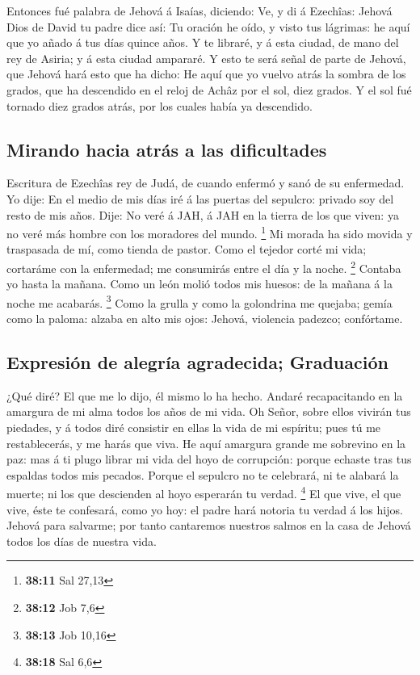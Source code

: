 Entonces fué palabra de Jehová á Isaías, diciendo:
 Ve, y di á Ezechîas: Jehová Dios de David tu padre dice
así: Tu oración he oído, y visto tus lágrimas: he aquí que yo añado á
tus días quince años.  Y te libraré, y á esta ciudad, de
mano del rey de Asiria; y á esta ciudad ampararé.  Y esto te
será señal de parte de Jehová, que Jehová hará esto que ha dicho:
 He aquí que yo vuelvo atrás la sombra de los grados, que ha
descendido en el reloj de Achâz por el sol, diez grados. Y el sol fué
tornado diez grados atrás, por los cuales había ya descendido.

\hypertarget{mirando-hacia-atruxe1s-a-las-dificultades}{%
\subsection{Mirando hacia atrás a las
dificultades}\label{mirando-hacia-atruxe1s-a-las-dificultades}}

 Escritura de Ezechîas rey de Judá, de cuando enfermó y sanó
de su enfermedad.  Yo dije: En el medio de mis días iré á
las puertas del sepulcro: privado soy del resto de mis años.
 Dije: No veré á JAH, á JAH en la tierra de los que viven:
ya no veré más hombre con los moradores del mundo. \footnote{\textbf{38:11}
  Sal 27,13}  Mi morada ha sido movida y traspasada de mí,
como tienda de pastor. Como el tejedor corté mi vida; cortaráme con la
enfermedad; me consumirás entre el día y la noche. \footnote{\textbf{38:12}
  Job 7,6}  Contaba yo hasta la mañana. Como un león molió
todos mis huesos: de la mañana á la noche me acabarás. \footnote{\textbf{38:13}
  Job 10,16}  Como la grulla y como la golondrina me
quejaba; gemía como la paloma: alzaba en alto mis ojos: Jehová,
violencia padezco; confórtame.

\hypertarget{expresiuxf3n-de-alegruxeda-agradecida-graduaciuxf3n}{%
\subsection{Expresión de alegría agradecida;
Graduación}\label{expresiuxf3n-de-alegruxeda-agradecida-graduaciuxf3n}}

 ¿Qué diré? El que me lo dijo, él mismo lo ha hecho. Andaré
recapacitando en la amargura de mi alma todos los años de mi vida.
 Oh Señor, sobre ellos vivirán tus piedades, y á todos diré
consistir en ellas la vida de mi espíritu; pues tú me restablecerás, y
me harás que viva.  He aquí amargura grande me sobrevino en
la paz: mas á ti plugo librar mi vida del hoyo de corrupción: porque
echaste tras tus espaldas todos mis pecados.  Porque el
sepulcro no te celebrará, ni te alabará la muerte; ni los que descienden
al hoyo esperarán tu verdad. \footnote{\textbf{38:18} Sal 6,6}
 El que vive, el que vive, éste te confesará, como yo hoy:
el padre hará notoria tu verdad á los hijos.  Jehová para
salvarme; por tanto cantaremos nuestros salmos en la casa de Jehová
todos los días de nuestra vida.

